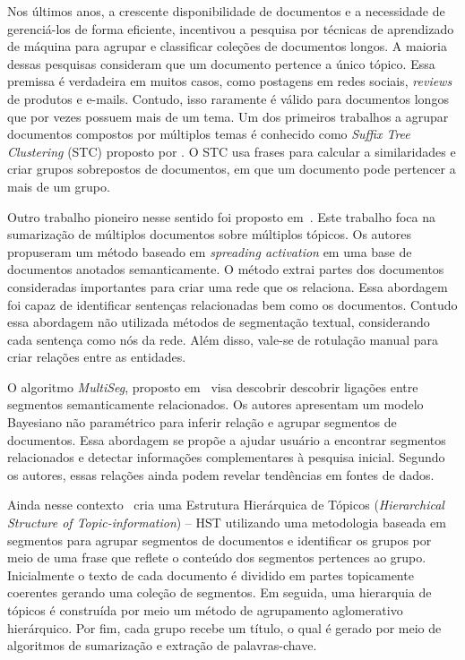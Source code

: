 Nos últimos anos, a crescente disponibilidade de documentos e a necessidade de gerenciá-los de forma eficiente, incentivou a pesquisa por técnicas de aprendizado de máquina para agrupar e classificar coleções de documentos longos. A maioria dessas pesquisas consideram que um documento pertence a único tópico. Essa premissa é verdadeira em muitos casos, como postagens em redes sociais, \textit{reviews} de produtos e e-mails. 
Contudo, isso raramente é válido para documentos longos que por vezes possuem mais de um tema. 
Um dos primeiros trabalhos a agrupar documentos compostos por múltiplos temas é conhecido como \textit{Suffix Tree Clustering} (STC) proposto por \cite{Zamir1998}. O STC usa frases para calcular a similaridades e criar grupos sobrepostos de documentos, em que um documento pode pertencer a mais de um grupo.

Outro trabalho pioneiro nesse sentido foi proposto em~\cite{Masao:2000}.
Este trabalho foca na sumarização de múltiplos documentos sobre múltiplos tópicos. Os autores propuseram um método baseado em \textit{spreading activation} em uma base de documentos anotados semanticamente. O método extrai partes dos documentos consideradas importantes para criar uma rede que os relaciona. Essa abordagem foi capaz de identificar sentenças relacionadas bem como os documentos. Contudo essa abordagem não utilizada métodos de segmentação textual, considerando cada sentença como nós da rede. Além disso, vale-se de rotulação manual para criar relações entre as entidades.



O algoritmo \textit{MultiSeg}, proposto em~\cite{Jeong:2010} visa descobrir descobrir ligações entre segmentos semanticamente relacionados. Os autores apresentam um modelo Bayesiano não paramétrico para inferir relação e agrupar segmentos de documentos. Essa abordagem se propõe a ajudar usuário a encontrar segmentos relacionados e detectar informações complementares à pesquisa inicial. Segundo os autores, essas relações ainda podem revelar tendências em fontes de dados.



Ainda nesse contexto~\cite{Cuong2011} cria uma Estrutura Hierárquica de Tópicos (\textit{Hierarchical Structure of Topic-information}) -- HST utilizando uma metodologia baseada em segmentos para agrupar segmentos de documentos e identificar os grupos por meio de uma frase que reflete o conteúdo dos segmentos pertences ao grupo.
Inicialmente o texto de cada documento é dividido em partes topicamente coerentes gerando uma coleção de segmentos. Em seguida, uma hierarquia de tópicos é construída por meio um método de agrupamento aglomerativo hierárquico. Por fim, cada grupo recebe um título, o qual é gerado por meio de algoritmos de sumarização e extração de palavras-chave.



